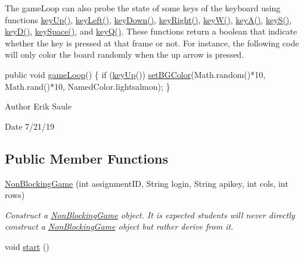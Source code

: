 The game\+Loop can also probe the state of some keys of the keyboard using functions \hyperlink{classbridges_1_1games_1_1_non_blocking_game_a524c340fabec1b7a69aa742e1347b7b4}{key\+Up()}, \hyperlink{classbridges_1_1games_1_1_non_blocking_game_ac8b9a6d6d4074105af6d28995091bd2b}{key\+Left()}, \hyperlink{classbridges_1_1games_1_1_non_blocking_game_ac59c5ac18a456cc1d69ec8d42a311840}{key\+Down()}, \hyperlink{classbridges_1_1games_1_1_non_blocking_game_a5a3db63942e995409daaf6b89f88b203}{key\+Right()}, \hyperlink{classbridges_1_1games_1_1_non_blocking_game_a45db18869044968a233a6f217650e34d}{key\+W()}, \hyperlink{classbridges_1_1games_1_1_non_blocking_game_a4328a21ca65c26e11161dfe362770917}{key\+A()}, \hyperlink{classbridges_1_1games_1_1_non_blocking_game_a4beb82246ef1eaf8c13aa406632ab936}{key\+S()}, \hyperlink{classbridges_1_1games_1_1_non_blocking_game_a830a2e8127b042f8915deb61f0038f2a}{key\+D()}, \hyperlink{classbridges_1_1games_1_1_non_blocking_game_a4ff32a8ba8aeb3f438751729f7380d16}{key\+Space()}, and \hyperlink{classbridges_1_1games_1_1_non_blocking_game_a4075b3185f2fe0d20c9ed9957c448aee}{key\+Q()}. These functions return a boolean that indicate whether the key is pressed at that frame or not. For instance, the following code will only color the board randomly when the up arrow is pressed.


\begin{DoxyCode}
\textcolor{keyword}{public} \textcolor{keywordtype}{void} \hyperlink{classbridges_1_1games_1_1_game_base_a56d05ed744791cfc1c3792f39ff438f1}{gameLoop}() \{
  \textcolor{keywordflow}{if} (\hyperlink{classbridges_1_1games_1_1_non_blocking_game_a524c340fabec1b7a69aa742e1347b7b4}{keyUp}())
    \hyperlink{classbridges_1_1games_1_1_game_base_ac9a231dd4425eb0f9dea2377653b23c4}{setBGColor}(Math.random()*10, Math.rand()*10, NamedColor.lightsalmon);
\}
\end{DoxyCode}


\begin{DoxyAuthor}{Author}
Erik Saule 
\end{DoxyAuthor}
\begin{DoxyDate}{Date}
7/21/19 
\end{DoxyDate}
\subsection*{Public Member Functions}
\begin{DoxyCompactItemize}
\item 
\hyperlink{classbridges_1_1games_1_1_non_blocking_game_ae85ea8dcc355372ba354f4e26323fb76}{Non\+Blocking\+Game} (int assignment\+ID, String login, String apikey, int cols, int rows)
\begin{DoxyCompactList}\small\item\em Construct a \hyperlink{classbridges_1_1games_1_1_non_blocking_game}{Non\+Blocking\+Game} object. It is expected students will never directly construct a \hyperlink{classbridges_1_1games_1_1_non_blocking_game}{Non\+Blocking\+Game} object but rather derive from it. \end{DoxyCompactList}\item 
void \hyperlink{classbridges_1_1games_1_1_non_blocking_game_ac4df60691641278f139d138c7347674a}{start} ()
\end{DoxyCompactItemize}
